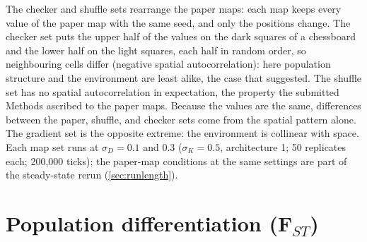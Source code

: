 \noindent The checker and shuffle sets rearrange the paper maps: each map
keeps every value of the paper map with the same seed, and only the
positions change. The checker set puts the upper half of the values on the
dark squares of a chessboard and the lower half on the light squares, each
half in random order, so neighbouring cells differ (negative spatial
autocorrelation): here population structure and the environment are least
alike, the case that \citet{booker_wza_2024} suggested. The shuffle set has
no spatial autocorrelation in expectation, the property the submitted
Methods ascribed to the paper maps. Because the values are the same,
differences between the paper, shuffle, and checker sets come from the
spatial pattern alone. The gradient set is the opposite extreme: the
environment is collinear with space. Each map set runs at $\sigma_D = 0.1$
and 0.3 ($\sigma_K=0.5$, architecture 1; 50 replicates each; 200,000
ticks); the paper-map conditions at the same settings are part of the
steady-state rerun (\cref{sec:runlength}).



\section{Population differentiation (F\texorpdfstring{$_{ST}$}{ST})}
\label{sec:fst}

